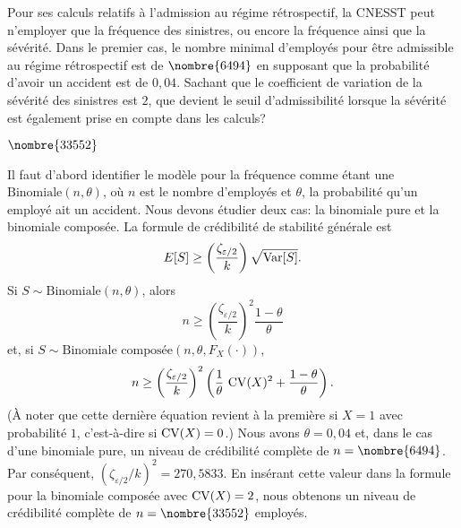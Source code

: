 \begin{exercice}
  Pour ses calculs relatifs à l'admission au régime rétrospectif, la
  CNESST peut n'employer que la fréquence des sinistres, ou encore la
  fréquence ainsi que la sévérité. Dans le premier cas, le nombre
  minimal d'employés pour être admissible au régime rétrospectif est
  de $\nombre{6494}$ en supposant que la probabilité d'avoir un accident
  est de $0,04$.  Sachant que le coefficient de variation de la sévérité
  des sinistres est $2$, que devient le seuil d'admissibilité
  lorsque la sévérité est également prise en compte dans les calculs?
  \begin{rep}
    $\nombre{33552}$
  \end{rep}
  \begin{sol}
    Il faut d'abord identifier le modèle pour la fréquence comme étant
    une $\text{Binomiale}(n, \theta)$, où $n$ est le nombre d'employés
    et $\theta$, la probabilité qu'un employé ait un accident. Nous
    devons étudier deux cas: la binomiale pure et la binomiale
    composée. La formule de crédibilité de stabilité générale est
    \begin{displaymath}
      E [ S ] \geq
      \left(
        \frac{\zeta_{\varepsilon/2}}{k}
      \right) \sqrt{\operatorname{Var} [ S ]}.
    \end{displaymath}
    Si $S \sim \text{Binomiale}(n, \theta)$, alors
    \begin{displaymath}
      n \geq
      \left(
        \frac{\zeta_{\varepsilon/2}}{k}
      \right)^2 \frac{1 - \theta}{\theta}
    \end{displaymath}
    et, si $S \sim \text{Binomiale composée}(n, \theta, F_X(\cdot))$,
    \begin{displaymath}
      n \geq
      \left(
        \frac{\zeta_{\varepsilon/2}}{k}
      \right)^2
      \left(
        \frac{1}{\theta}\, \operatorname{CV}(X)^2 +
        \frac{1 - \theta}{\theta}
      \right).
    \end{displaymath}
    (À noter que cette dernière équation revient à la première si
    $X = 1$ avec probabilité $1$, c'est-à-dire si $\operatorname{CV}(X) = 0$.) Nous
    avons $\theta = 0,04$ et, dans le cas d'une binomiale pure, un
    niveau de crédibilité complète de $n = \nombre{6494}$. Par
    conséquent, $(\zeta_{\varepsilon/2}/k)^2 = 270,5833$. En insérant
    cette valeur dans la formule pour la binomiale composée avec
    $\operatorname{CV}(X) = 2$, nous obtenons un niveau de crédibilité complète de
    $n = \nombre{33552}$ employés.
  \end{sol}
\end{exercice}

